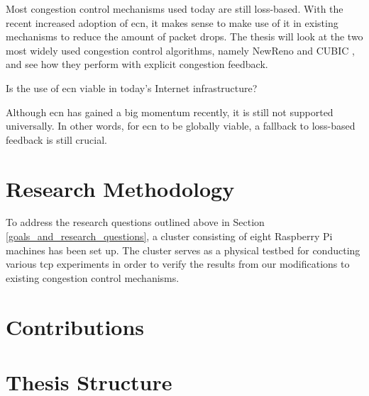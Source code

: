 Most congestion control mechanisms used today are still loss-based. With the recent increased adoption of \gls{ecn}, it makes sense to make use of it in existing mechanisms to reduce the amount of packet drops. The thesis will look at the two most widely used congestion control algorithms, namely NewReno and CUBIC , and see how they perform with explicit congestion feedback.

\begin{statement}
    Is the use of \gls{ecn} viable in today's Internet infrastructure? 
\end{statement}

Although \gls{ecn} has gained a big momentum recently, it is still not supported universally.   In other words, for \gls{ecn} to be globally viable, a fallback to loss-based feedback is still crucial.



\section{Research Methodology}

To address the research questions outlined above in Section \ref{goals_and_research_questions}, a cluster consisting of eight Raspberry Pi machines has been set up. The cluster serves as a physical testbed for conducting various \gls{tcp} experiments in order to verify the results from our modifications to existing congestion control mechanisms.






\section{Contributions}

\todo{}





\section{Thesis Structure}

\todo{}